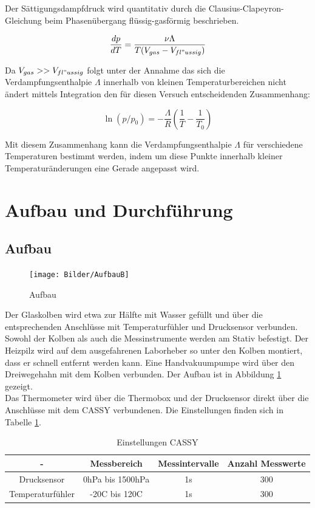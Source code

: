 \documentclass[12pt,a4paper]{article}
\begin{document}
Der Sättigungsdampfdruck wird quantitativ durch die Clausius-Clapeyron-Gleichung beim Phasenübergang flüssig-gasförmig beschrieben.

\begin{equation}
\frac{dp}{dT}=\frac{\nu \Lambda}{T(V_{gas}-			V_{fl"ussig})}
\end{equation}

Da $V_{gas} >> V_{fl"ussig}$ folgt unter der Annahme das sich die Verdampfungsenthalpie $\Lambda$ innerhalb von kleinen Temperaturbereichen nicht ändert mittels Integration den für diesen Versuch entscheidenden Zusammenhang:

\begin{equation}
\ln{(p/p_0)}=-\frac{\Lambda}{R} \left(\frac{1}{T}-			\frac{1}{T_0}\right)
\end{equation}

Mit diesem Zusammenhang kann die Verdampfungsenthalpie $\Lambda$ für verschiedene Temperaturen bestimmt werden, indem um diese Punkte innerhalb kleiner Temperaturänderungen eine Gerade angepasst wird.
\newpage
\section{Aufbau und Durchführung}
\label{sec:Aufbau und Durchfühung}

\subsection{Aufbau}

\begin{figure}[H]
\texttt{[image: Bilder/AufbauB]}
\caption[AufbauB]{Aufbau}
\label{fig:AufbauB}
\end{figure}

Der Glaskolben wird etwa zur Hälfte mit Wasser gefüllt und über die entsprechenden Anschlüsse mit Temperaturfühler und Drucksensor verbunden. Sowohl der Kolben als auch die Messinstrumente werden am Stativ befestigt. Der Heizpilz wird auf dem ausgefahrenen Laborheber so unter den Kolben montiert, dass er schnell entfernt werden kann. Eine Handvakuumpumpe wird über den Dreiwegehahn mit dem Kolben verbunden. Der Aufbau ist in Abbildung \ref{fig:AufbauB} gezeigt.\\
Das Thermometer wird über die Thermobox und der Drucksensor direkt über die Anschlüsse mit dem CASSY verbundenen. Die Einstellungen finden sich in Tabelle \ref{tab:CASSY}. \\

\begin{table}[H]
\begin{center}
\begin{tabular}{|c|c|c|c|}
\hline
- & Messbereich & Messintervalle & Anzahl Messwerte\\
\hline
Drucksensor & 0hPa bis 1500hPa& 1s & 300\\
\hline
Temperaturfühler & -20C bis 120C& 1s & 300\\
\hline
\end{tabular}
\caption{Einstellungen CASSY}
\label{tab:CASSY}
\end{center}
\end{table}
\end{document}
